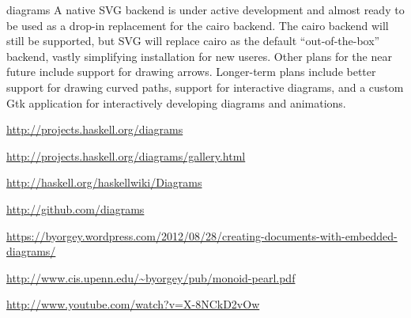 \documentclass{article}
\begin{document}
\begin{hcarentry}[updated]{diagrams}
A native SVG backend is under active development and almost ready to
be used as a drop-in replacement for the cairo backend.  The cairo
backend will still be supported, but SVG will replace cairo as the
default ``out-of-the-box'' backend, vastly simplifying installation
for new useres. Other plans for the near future include support for
drawing arrows.  Longer-term plans include better support for drawing
curved paths, support for interactive diagrams, and a custom Gtk
application for interactively developing diagrams and animations.

\FurtherReading
\begin{compactitem}
\item \url{http://projects.haskell.org/diagrams}
\item \url{http://projects.haskell.org/diagrams/gallery.html}
\item \url{http://haskell.org/haskellwiki/Diagrams}
\item \url{http://github.com/diagrams}
\item
  \url{https://byorgey.wordpress.com/2012/08/28/creating-documents-with-embedded-diagrams/}
\item \url{http://www.cis.upenn.edu/~byorgey/pub/monoid-pearl.pdf}
\item \url{http://www.youtube.com/watch?v=X-8NCkD2vOw}
\end{compactitem}
\end{hcarentry}
\end{document}
